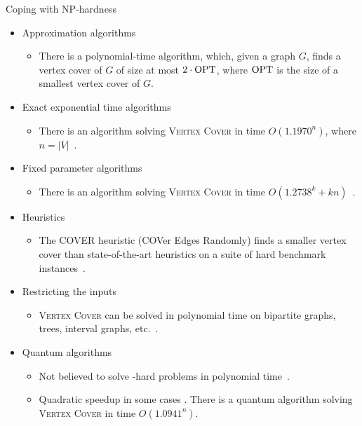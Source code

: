 \begin{frame}{Coping with NP-hardness}
	\begin{itemize}
		\item Approximation algorithms
		      \begin{itemize}
			      \item There is a polynomial-time algorithm, which, given a graph $G$, finds a vertex cover of $G$ of size at most $2\cdot \text{\normalfont OPT}$, where $\text{\normalfont OPT}$ is the size of a smallest vertex cover of $G$.
		      \end{itemize}
		\item Exact exponential time algorithms
		      \begin{itemize}
			      \item There is an algorithm solving \textsc{Vertex Cover} in time $O(1.1970^n)$, where $n=|V|$~\cite{XiaoN17}.
		      \end{itemize}
		\item Fixed parameter algorithms
		      \begin{itemize}
			      \item There is an algorithm solving \textsc{Vertex Cover} in time $O(1.2738^k+kn)$~\cite{ChenKX10}.
		      \end{itemize}
		\item Heuristics
		      \begin{itemize}
			      \item The COVER heuristic (COVer Edges Randomly) finds a smaller vertex cover than state-of-the-art heuristics on a suite of hard benchmark instances~\cite{RichterHG07}.
		      \end{itemize}
		\item Restricting the inputs
		      \begin{itemize}
			      \item \textsc{Vertex Cover} can be solved in polynomial time on bipartite graphs, trees, interval graphs, etc.~\cite{Golumbic04}.
		      \end{itemize}
		\item Quantum algorithms
		      \begin{itemize}
			      \item Not believed to solve \NP-hard problems in polynomial time~\cite{Aaronson05}.
				  \item Quadratic speedup in some cases \cite{AmbainisK17,Furer08}.
				        There is a quantum algorithm solving \textsc{Vertex Cover} in time $O(1.0941^n)$.
		      \end{itemize}
	\end{itemize}
\end{frame}

